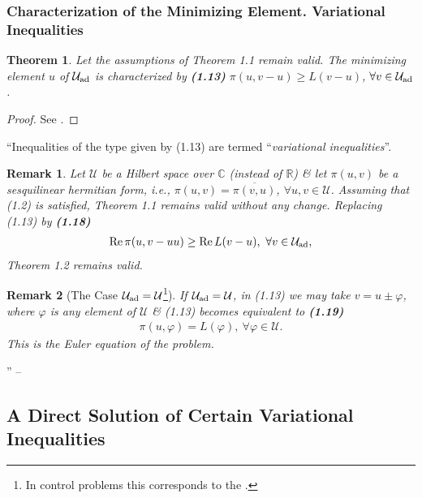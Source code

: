 \documentclass[oneside]{book}
\numberwithin{equation}{section}
\newtheorem{remark}{Remark}[chapter]
\newtheorem{theorem}{Theorem}[chapter]
\begin{document}
\subsubsection{Characterization of the Minimizing Element. Variational Inequalities}
\begin{theorem}
	Let the assumptions of Theorem 1.1 remain valid. The minimizing element $u$ of $\mathcal{U}_{\rm ad}$ is characterized by \textbf{(1.13)} $\pi(u,v - u)\ge L(v - u)$, $\forall v\in\mathcal{U}_{\rm ad}$.
\end{theorem}

\begin{proof}
	See \cite[p. 9]{Lions1971}.
\end{proof}
``Inequalities of the type given by (1.13) are termed ``\textit{variational inequalities}''.

\begin{remark}
	Let $\mathcal{U}$ be a Hilbert space over $\mathbb{C}$ (instead of $\mathbb{R}$) \& let $\pi(u,v)$ be a sesquilinear hermitian form, i.e., $\pi(u,v) = \overline{\pi(v,u)}$, $\forall u,v\in\mathcal{U}$. Assuming that (1.2) is satisfied, Theorem 1.1 remains valid without any change. Replacing (1.13) by \textbf{(1.18)}
	\begin{align*}
		\operatorname{Re}\pi(u,v - uu)\ge\operatorname{Re}L(v - u),\ \forall v\in\mathcal{U}_{\rm ad},
	\end{align*}
	Theorem 1.2 remains valid.
\end{remark}

\begin{remark}[The Case $\mathcal{U}_{\rm ad} = \mathcal{U}$\footnote{In control problems this corresponds to the .}]
	If $\mathcal{U}_{\rm ad} = \mathcal{U}$, in (1.13) we may take $v = u\pm\varphi$, where $\varphi$ is any element of $\mathcal{U}$ \& (1.13) becomes equivalent to \textbf{(1.19)}
	\begin{align*}
		\pi(u,\varphi) = L(\varphi),\ \forall\varphi\in\mathcal{U}.
	\end{align*}
	This is the \emph{Euler equation} of the problem.
\end{remark}

'' -- \cite[pp. 9--]{Lions1971}

\subsection{A Direct Solution of Certain Variational Inequalities}
\end{document}
